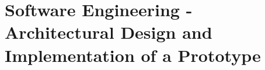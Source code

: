 \chapter{Software Engineering - Architectural Design and Implementation of a Prototype}
\label{chap:prototype}
\minitoc \mtcskip \noindent 









